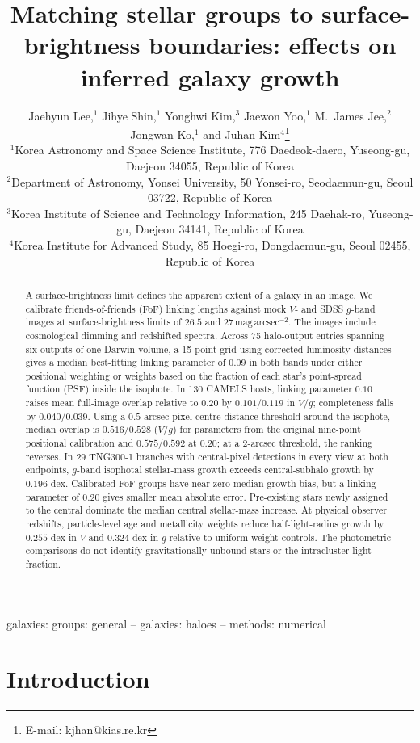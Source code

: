 \documentclass[usenatbib]{mnras}
\title[Stellar groups and surface-brightness boundaries]
{Matching stellar groups to surface-brightness boundaries: effects on inferred galaxy growth}
\author[Lee et al.]{%
Jaehyun Lee,$^{1}$
\newauthor
Jihye Shin,$^{1}$
Yonghwi Kim,$^{3}$
Jaewon Yoo,$^{1}$
M.~James Jee,$^{2}$
Jongwan Ko,$^{1}$
and Juhan Kim$^{4}$\thanks{E-mail: kjhan@kias.re.kr}
\\
$^{1}$Korea Astronomy and Space Science Institute, 776 Daedeok-daero, Yuseong-gu, Daejeon 34055, Republic of Korea\\
$^{2}$Department of Astronomy, Yonsei University, 50 Yonsei-ro, Seodaemun-gu, Seoul 03722, Republic of Korea\\
$^{3}$Korea Institute of Science and Technology Information, 245 Daehak-ro, Yuseong-gu, Daejeon 34141, Republic of Korea\\
$^{4}$Korea Institute for Advanced Study, 85 Hoegi-ro, Dongdaemun-gu, Seoul 02455, Republic of Korea
}
\begin{document}
\label{firstpage}
\pagerange{\pageref{firstpage}--\pageref{lastpage}}
\maketitle

\begin{abstract}
A surface-brightness limit defines the apparent extent of a galaxy in an image. We calibrate friends-of-friends (FoF) linking lengths against mock $V$- and SDSS $g$-band images at surface-brightness limits of $26.5$ and $27\,\mathrm{mag\,arcsec}^{-2}$. The images include cosmological dimming and redshifted spectra. Across 75 halo-output entries spanning six outputs of one Darwin volume, a 15-point grid using corrected luminosity distances gives a median best-fitting linking parameter of $0.09$ in both bands under either positional weighting or weights based on the fraction of each star's point-spread function (PSF) inside the isophote. In 130 CAMELS hosts, linking parameter $0.10$ raises mean full-image overlap relative to $0.20$ by $0.101/0.119$ in $V/g$; completeness falls by $0.040/0.039$.
Using a $0.5$-arcsec pixel-centre distance threshold around the isophote, median overlap is $0.516/0.528$ ($V/g$) for parameters from the original nine-point positional calibration and $0.575/0.592$ at $0.20$; at a $2$-arcsec threshold, the ranking reverses. In 29 TNG300-1 branches with central-pixel detections in every view at both endpoints, $g$-band isophotal stellar-mass growth exceeds central-subhalo growth by $0.196$ dex. Calibrated FoF groups have near-zero median growth bias, but a linking parameter of $0.20$ gives smaller mean absolute error. Pre-existing stars newly assigned to the central dominate the median central stellar-mass increase. At physical observer redshifts, particle-level age and metallicity weights reduce half-light-radius growth by $0.255$ dex in $V$ and $0.324$ dex in $g$ relative to uniform-weight controls. The photometric comparisons do not identify gravitationally unbound stars or the intracluster-light fraction.
\end{abstract}

\begin{keywords}
galaxies: groups: general -- galaxies: haloes -- methods: numerical
\end{keywords}

\section{Introduction}
\label{sec:intro}
\end{document}

